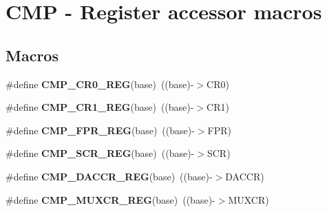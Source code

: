 \hypertarget{group___c_m_p___register___accessor___macros}{}\section{C\+MP -\/ Register accessor macros}
\label{group___c_m_p___register___accessor___macros}
\subsection*{Macros}
\begin{DoxyCompactItemize}
\item 
\mbox{\label{group___c_m_p___register___accessor___macros_ga027ebf4e2c4654b6e863e070cb299128}} 
\#define {\bfseries C\+M\+P\+\_\+\+C\+R0\+\_\+\+R\+EG}(base)~((base)-\/$>$C\+R0)
\item 
\mbox{\label{group___c_m_p___register___accessor___macros_gaccbe9acfec0cbe3a83f7331f899f3240}} 
\#define {\bfseries C\+M\+P\+\_\+\+C\+R1\+\_\+\+R\+EG}(base)~((base)-\/$>$C\+R1)
\item 
\mbox{\label{group___c_m_p___register___accessor___macros_gac3a57bc4a8faf059f7271bca5af68846}} 
\#define {\bfseries C\+M\+P\+\_\+\+F\+P\+R\+\_\+\+R\+EG}(base)~((base)-\/$>$F\+PR)
\item 
\mbox{\label{group___c_m_p___register___accessor___macros_ga678da61cf26cf0494da5f50012b39a88}} 
\#define {\bfseries C\+M\+P\+\_\+\+S\+C\+R\+\_\+\+R\+EG}(base)~((base)-\/$>$S\+CR)
\item 
\mbox{\label{group___c_m_p___register___accessor___macros_ga5b7c17c68ee9198e701deff8f750ca2b}} 
\#define {\bfseries C\+M\+P\+\_\+\+D\+A\+C\+C\+R\+\_\+\+R\+EG}(base)~((base)-\/$>$D\+A\+C\+CR)
\item 
\mbox{\label{group___c_m_p___register___accessor___macros_gaf82bcece4b697f01171a785589591a8c}} 
\#define {\bfseries C\+M\+P\+\_\+\+M\+U\+X\+C\+R\+\_\+\+R\+EG}(base)~((base)-\/$>$M\+U\+X\+CR)
\item 

\end{DoxyCompactItemize}
